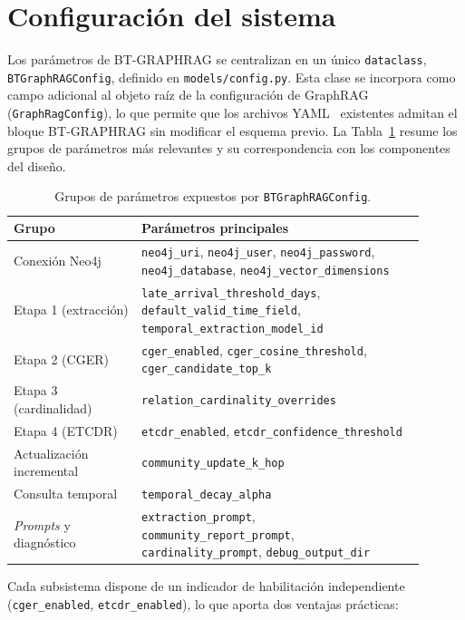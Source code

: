 \section{Configuración del sistema}\label{sec:impl-config}

Los parámetros de BT-GRAPHRAG se centralizan en un único \texttt{dataclass}, \texttt{BTGraphRAGConfig}, definido en \texttt{models/config.py}. Esta clase se incorpora como campo adicional al objeto raíz de la configuración de GraphRAG (\texttt{GraphRagConfig}), lo que permite que los archivos YAML~\cite{TODO_yaml} existentes admitan el bloque BT-GRAPHRAG sin modificar el esquema previo. La Tabla~\ref{tab:impl-config} resume los grupos de parámetros más relevantes y su correspondencia con los componentes del diseño.

\begin{table}[H]
\centering
\small
\begin{tabular}{p{0.28\linewidth}p{0.62\linewidth}}
\hline
\textbf{Grupo} & \textbf{Parámetros principales} \\ \hline
Conexión Neo4j & \texttt{neo4j\_uri}, \texttt{neo4j\_user}, \texttt{neo4j\_password}, \texttt{neo4j\_database}, \texttt{neo4j\_vector\_dimensions} \\
Etapa 1 (extracción) & \texttt{late\_arrival\_threshold\_days}, \texttt{default\_valid\_time\_field}, \texttt{temporal\_extraction\_model\_id} \\
Etapa 2 (CGER) & \texttt{cger\_enabled}, \texttt{cger\_cosine\_threshold}, \texttt{cger\_candidate\_top\_k} \\
Etapa 3 (cardinalidad) & \texttt{relation\_cardinality\_overrides} \\
Etapa 4 (ETCDR) & \texttt{etcdr\_enabled}, \texttt{etcdr\_confidence\_threshold} \\
Actualización incremental & \texttt{community\_update\_k\_hop} \\
Consulta temporal & \texttt{temporal\_decay\_alpha} \\
\emph{Prompts} y diagnóstico & \texttt{extraction\_prompt}, \texttt{community\_report\_prompt}, \texttt{cardinality\_prompt}, \texttt{debug\_output\_dir} \\ \hline
\end{tabular}
\caption{Grupos de parámetros expuestos por \texttt{BTGraphRAGConfig}.}
\label{tab:impl-config}
\end{table}

Cada subsistema dispone de un indicador de habilitación independiente (\texttt{cger\_enabled}, \texttt{etcdr\_enabled}), lo que aporta dos ventajas prácticas:

